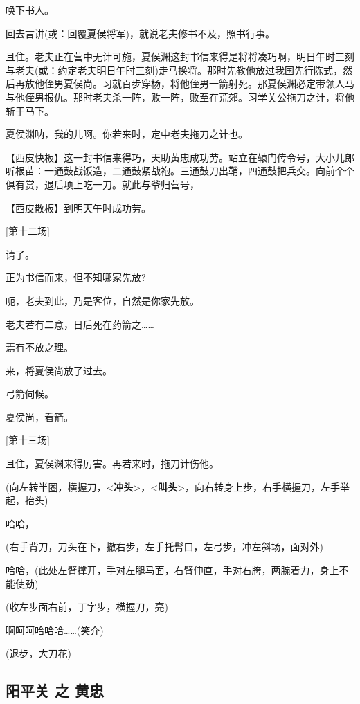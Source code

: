 唤下书人。

回去言讲(或：回覆夏侯将军)，就说老夫修书不及，照书行事。

且住。老夫正在营中无计可施，夏侯渊这封书信来得是将将凑巧啊，明日午时三刻与老夫(或：约定老夫明日午时三刻)走马换将。那时先教他放过我国先行陈式，然后再放他侄男夏侯尚。习就百步穿杨，将他侄男一箭射死。那夏侯渊必定带领人马与他侄男报仇。那时老夫杀一阵，败一阵，败至在荒郊。习学关公拖刀之计，将他斩于马下。

夏侯渊呐，我的儿啊。你若来时，定中老夫拖刀之计也。

【西皮快板】这一封书信来得巧，天助黄忠成功劳。站立在辕门传令号，大小儿郎听根苗：一通鼓战饭造，二通鼓紧战袍。三通鼓刀出鞘，四通鼓把兵交。向前个个俱有赏，退后项上吃一刀。就此与爷归营号，

【西皮散板】到明天午时成功劳。

{[}第十二场{]}

请了。

正为书信而来，但不知哪家先放?

呃，老夫到此，乃是客位，自然是你家先放。

老夫若有二意，日后死在药箭之\ldots{}\ldots{}

焉有不放之理。

来，将夏侯尚放了过去。

弓箭伺候。

夏侯尚，看箭。

{[}第十三场{]}

且住，夏侯渊来得厉害。再若来时，拖刀计伤他。

(向左转半圈，横握刀，\textless{}\textbf{冲头}\textgreater{}，\textless{}\textbf{叫头}\textgreater{}，向右转身上步，右手横握刀，左手举起，抬头)

哈哈，

(右手背刀，刀头在下，撤右步，左手托髯口，左弓步，冲左斜场，面对外)

哈哈，(此处左臂撑开，手对左腿马面，右臂伸直，手对右胯，两腕着力，身上不能使劲)

(收左步面右前，丁字步，横握刀，亮)

啊呵呵哈哈哈\ldots{}\ldots{}(笑介)

(退步，大刀花)

\newpage
\hypertarget{ux9633ux5e73ux5173-ux4e4b-ux9ec4ux5fe0}{%
\subsection{阳平关 之
黄忠}\label{ux9633ux5e73ux5173-ux4e4b-ux9ec4ux5fe0}}

